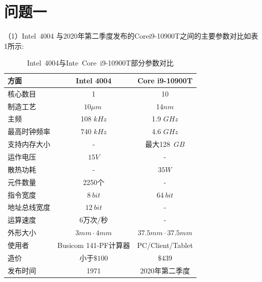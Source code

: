 \documentclass[12pt]{article}
\begin{document}
\section{问题一}
（1）Intel~4004 与2020年第二季度发布的Core\;i9-10900T之间的主要参数对比如表1所示:
	\begin{table}[h] 
		\centering
		\caption{Intel~4004与Inte~Core~i9-10900T部分参数对比}
		
		\begin{tabular}{|l|c|c|}\hline
			方面&Intel 4004&Core i9-10900T\\\hline
			核心数目 & 1 & 10 \\
			制造工艺  & $10 \mu m\;$ & 14$nm$\\
			主频 & 108 $kHz$ & 1.9 $GHz$\\
			最高时钟频率 & 740 $kHz$  & 4.6  $GHz$\\
			支持内存大小&-&最大128~$GB$\\
			运作电压& $15V$ & - \\
			散热功耗 & - & $35W$ \\
			元件数量&2250个& - \\
			指令宽度&$8~bit$&$64~bit$\\
			地址总线宽度&$12~bit$&-\\
			运算速度 & 6万次/秒 & -\\
			外形大小 & $3mm\cdot 4mm$  & $37.5mm\cdot 37.5mm$\\ 
			使用者 & Busicom 141-PF计算器& PC/Client/Tablet\\
			造价 & 小于$\$100$& $\$439$\\
			发布时间&1971&2020年第二季度\\
			\hline
		\end{tabular}
	\end{table}
\end{document}
